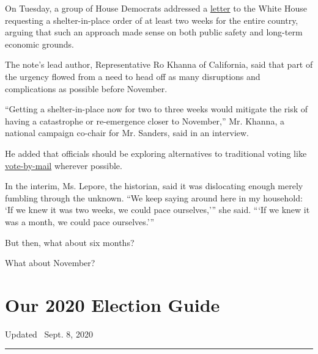 On Tuesday, a group of House Democrats addressed a
\href{https://khanna.house.gov/sites/khanna.house.gov/files/Shelter\%20in\%20Place\%20Letter.pdf}{letter}
to the White House requesting a shelter-in-place order of at least two
weeks for the entire country, arguing that such an approach made sense
on both public safety and long-term economic grounds.

The note's lead author, Representative Ro Khanna of California, said
that part of the urgency flowed from a need to head off as many
disruptions and complications as possible before November.

``Getting a shelter-in-place now for two to three weeks would mitigate
the risk of having a catastrophe or re-emergence closer to November,''
Mr. Khanna, a national campaign co-chair for Mr. Sanders, said in an
interview.

He added that officials should be exploring alternatives to traditional
voting like
\href{https://www.nytimes3xbfgragh.onion/2020/03/19/us/politics/voting-by-mail-coronavirus.html}{vote-by-mail}
wherever possible.

In the interim, Ms. Lepore, the historian, said it was dislocating
enough merely fumbling through the unknown. ``We keep saying around here
in my household: `If we knew it was two weeks, we could pace
ourselves,''' she said. ```If we knew it was a month, we could pace
ourselves.'''

But then, what about six months?

What about November?

\hypertarget{our-2020-election-guide}{%
\section{Our 2020 Election Guide}\label{our-2020-election-guide}}

Updated ~Sept. 8, 2020

\begin{center}\rule{0.5\linewidth}{\linethickness}\end{center}

